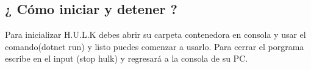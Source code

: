 \documentclass[a4paper,12pt]{article}
\begin{document}
    \subsection{¿ Cómo iniciar y detener ?}\label{sub:final}
    \begin{flushleft}
        Para inicializar H.U.L.K debes abrir su carpeta contenedora en consola y usar el comando(dotnet run)
        y listo puedes comenzar a usarlo. Para cerrar el porgrama escribe en el input (stop hulk) y regresará a la consola de su PC.
    \end{flushleft}
\end{document}
